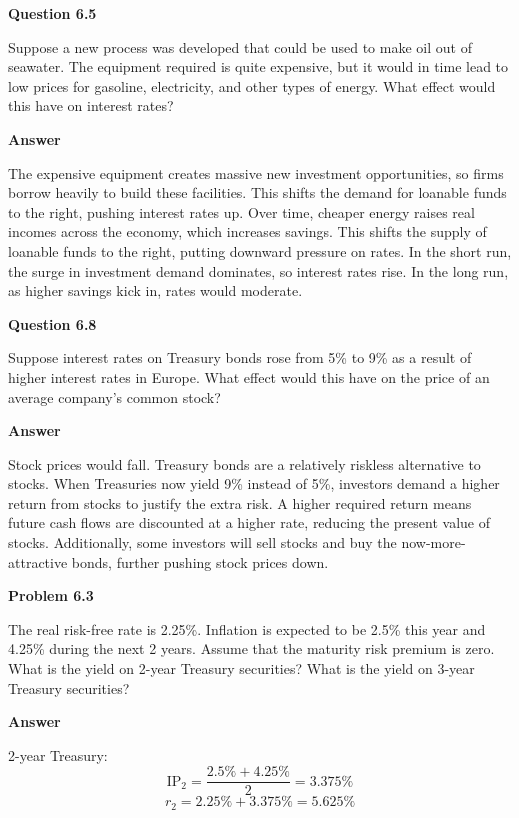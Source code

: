 \documentclass[11pt]{article}
\begin{document}
\textbf{Question 6.5}
\bigskip

Suppose a new process was developed that could be used to make oil out of seawater. The equipment required is quite expensive, but it would in time lead to low prices for gasoline, electricity, and other types of energy. What effect would this have on interest rates?

\bigskip
\textbf{Answer}
\bigskip

The expensive equipment creates massive new investment opportunities, so firms borrow heavily to build these facilities. This shifts the demand for loanable funds to the right, pushing interest rates up. Over time, cheaper energy raises real incomes across the economy, which increases savings. This shifts the supply of loanable funds to the right, putting downward pressure on rates. In the short run, the surge in investment demand dominates, so interest rates rise. In the long run, as higher savings kick in, rates would moderate.

\bigskip\bigskip

\textbf{Question 6.8}
\bigskip

Suppose interest rates on Treasury bonds rose from 5\% to 9\% as a result of higher interest rates in Europe. What effect would this have on the price of an average company's common stock?

\bigskip
\textbf{Answer}
\bigskip

Stock prices would fall. Treasury bonds are a relatively riskless alternative to stocks. When Treasuries now yield 9\% instead of 5\%, investors demand a higher return from stocks to justify the extra risk. A higher required return means future cash flows are discounted at a higher rate, reducing the present value of stocks. Additionally, some investors will sell stocks and buy the now-more-attractive bonds, further pushing stock prices down.

\bigskip\bigskip

\textbf{Problem 6.3}
\bigskip

The real risk-free rate is 2.25\%. Inflation is expected to be 2.5\% this year and 4.25\% during the next 2 years. Assume that the maturity risk premium is zero. What is the yield on 2-year Treasury securities? What is the yield on 3-year Treasury securities?

\bigskip
\textbf{Answer}
\bigskip

2-year Treasury:
\[
\text{IP}_2 = \frac{2.5\% + 4.25\%}{2} = 3.375\%
\]
\[
r_2 = 2.25\% + 3.375\% = \boxed{5.625\%}
\]
\end{document}
